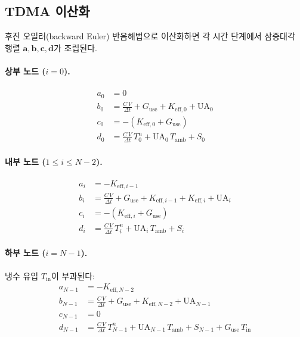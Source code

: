 \subsection{TDMA 이산화}

후진 오일러(backward Euler) 반음해법으로 이산화하면 각 시간 단계에서 삼중대각 행렬 $\mathbf{a},\mathbf{b},\mathbf{c},\mathbf{d}$가 조립된다.

\paragraph{상부 노드 ($i = 0$).}
\begin{align}
  a_0 &= 0 \label{eq:tdma-top-a}\\
  b_0 &= \frac{C\,V}{\Delta t} + G_\text{use} + K_{\text{eff},0} + \text{UA}_0 \label{eq:tdma-top-b}\\
  c_0 &= -(K_{\text{eff},0} + G_\text{use}) \label{eq:tdma-top-c}\\
  d_0 &= \frac{C\,V}{\Delta t}\,T_0^n + \text{UA}_0\,T_\text{amb} + S_0 \label{eq:tdma-top-d}
\end{align}

\paragraph{내부 노드 ($1 \le i \le N-2$).}
\begin{align}
  a_i &= -K_{\text{eff},i-1} \label{eq:tdma-int-a}\\
  b_i &= \frac{C\,V}{\Delta t} + G_\text{use} + K_{\text{eff},i-1} + K_{\text{eff},i} + \text{UA}_i \label{eq:tdma-int-b}\\
  c_i &= -(K_{\text{eff},i} + G_\text{use}) \label{eq:tdma-int-c}\\
  d_i &= \frac{C\,V}{\Delta t}\,T_i^n + \text{UA}_i\,T_\text{amb} + S_i \label{eq:tdma-int-d}
\end{align}

\paragraph{하부 노드 ($i = N-1$).}
냉수 유입 $T_\text{in}$이 부과된다:
\begin{align}
  a_{N-1} &= -K_{\text{eff},N-2} \label{eq:tdma-bot-a}\\
  b_{N-1} &= \frac{C\,V}{\Delta t} + G_\text{use} + K_{\text{eff},N-2} + \text{UA}_{N-1} \label{eq:tdma-bot-b}\\
  c_{N-1} &= 0 \label{eq:tdma-bot-c}\\
  d_{N-1} &= \frac{C\,V}{\Delta t}\,T_{N-1}^n + \text{UA}_{N-1}\,T_\text{amb} + S_{N-1} + G_\text{use}\,T_\text{in} \label{eq:tdma-bot-d}
\end{align}

